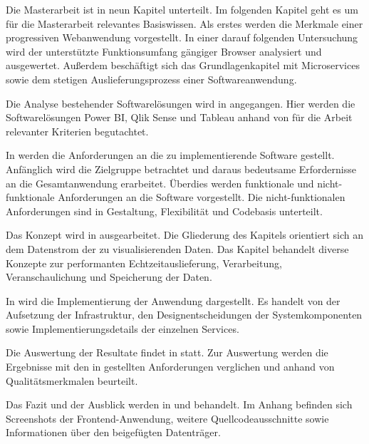 Die Masterarbeit ist in neun Kapitel unterteilt. Im folgenden Kapitel geht es um für
die Masterarbeit relevantes Basiswissen. Als erstes werden die Merkmale einer progressiven
Webanwendung vorgestellt. In einer darauf folgenden Untersuchung wird der
unterstützte Funktionsumfang gängiger Browser analysiert und ausgewertet.
Außerdem beschäftigt sich das Grundlagenkapitel mit Microservices
sowie dem stetigen Auslieferungsprozess einer Softwareanwendung.

Die Analyse bestehender Softwarelösungen wird in 
angegangen. Hier werden die Softwarelösungen Power BI, Qlik Sense und Tableau anhand von für
die Arbeit relevanter Kriterien begutachtet.

In  werden die Anforderungen an die zu implementierende Software
gestellt. Anfänglich wird die Zielgruppe betrachtet und daraus bedeutsame Erfordernisse
an die Gesamtanwendung erarbeitet. Überdies werden funktionale und nicht-funktionale Anforderungen
an die Software vorgestellt. Die nicht-funktionalen Anforderungen sind in 
Gestaltung, Flexibilität und Codebasis unterteilt.

Das Konzept wird in  ausgearbeitet. Die Gliederung des Kapitels
orientiert sich an dem Datenstrom der zu visualisierenden Daten. Das Kapitel behandelt
diverse Konzepte zur performanten Echtzeitauslieferung, Verarbeitung, Veranschaulichung
und Speicherung der Daten.

In  wird die Implementierung der Anwendung dargestellt. Es
handelt von der Aufsetzung der Infrastruktur, den Designentscheidungen der
Systemkomponenten sowie Implementierungsdetails der einzelnen Services.

Die Auswertung der Resultate findet in  statt. Zur Auswertung werden
die Ergebnisse mit den in  gestellten Anforderungen verglichen
und anhand von Qualitätsmerkmalen beurteilt.

Das Fazit und der Ausblick werden in  und  behandelt. Im Anhang befinden
sich Screenshots der Frontend-Anwendung, weitere Quellcodeausschnitte sowie Informationen
über den beigefügten Datenträger.

